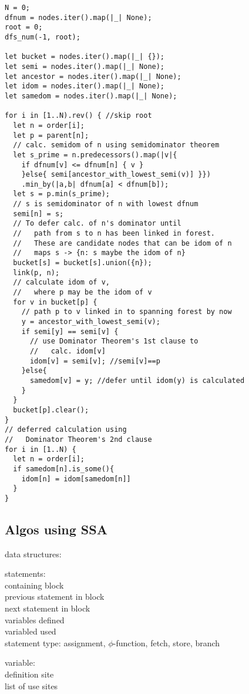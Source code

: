 \documentclass[8pt]{extarticle}
\begin{document}
\begin{multicols*}{2}
\begin{verbatim}
N = 0;
dfnum = nodes.iter().map(|_| None);
root = 0;
dfs_num(-1, root);

let bucket = nodes.iter().map(|_| {});
let semi = nodes.iter().map(|_| None);
let ancestor = nodes.iter().map(|_| None);
let idom = nodes.iter().map(|_| None);
let samedom = nodes.iter().map(|_| None);

for i in [1..N).rev() { //skip root
  let n = order[i];
  let p = parent[n];
  // calc. semidom of n using semidominator theorem
  let s_prime = n.predecessors().map(|v|{
    if dfnum[v] <= dfnum[n] { v }
    }else{ semi[ancestor_with_lowest_semi(v)] }})
    .min_by(|a,b| dfnum[a] < dfnum[b]);
  let s = p.min(s_prime);
  // s is semidominator of n with lowest dfnum
  semi[n] = s; 
  // To defer calc. of n's dominator until
  //   path from s to n has been linked in forest.
  //   These are candidate nodes that can be idom of n
  //   maps s -> {n: s maybe the idom of n}
  bucket[s] = bucket[s].union({n});
  link(p, n);
  // calculate idom of v,
  //   where p may be the idom of v
  for v in bucket[p] {
    // path p to v linked in to spanning forest by now
    y = ancestor_with_lowest_semi(v);
    if semi[y] == semi[v] {
      // use Dominator Theorem's 1st clause to
      //   calc. idom[v]
      idom[v] = semi[v]; //semi[v]==p
    }else{
      samedom[v] = y; //defer until idom(y) is calculated
    }
  }
  bucket[p].clear();
}
// deferred calculation using
//   Dominator Theorem's 2nd clause
for i in [1..N) {
  let n = order[i];
  if samedom[n].is_some(){
    idom[n] = idom[samedom[n]]
  }
}
\end{verbatim}

\vfill\null
\columnbreak

\subsection{Algos using SSA}

  data structures:

  statements:\\
  containing block\\
  previous statement in block\\
  next statement in block\\
  variables defined\\
  variabled used\\
  statement type: assignment, $\phi$-function, fetch, store, branch

  variable:\\
  definition site\\
  list of use sites


\end{multicols*}
\end{document}
